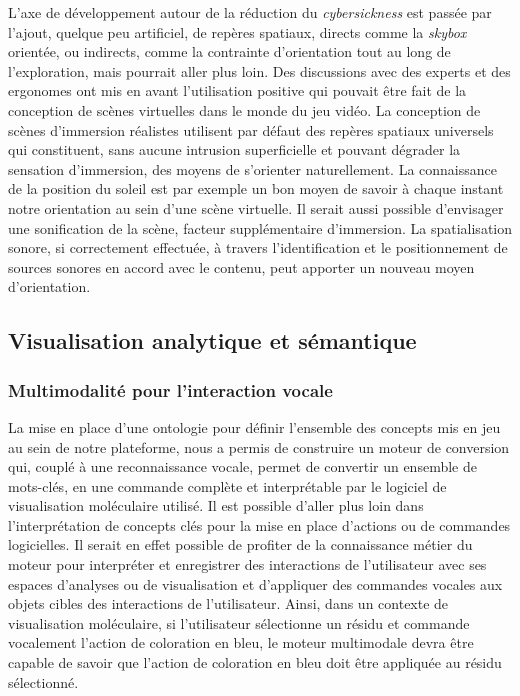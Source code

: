 L'axe de développement autour de la réduction du \textit{cybersickness} est passée par l'ajout, quelque peu artificiel, de repères spatiaux, directs comme la \textit{skybox} orientée, ou indirects, comme la contrainte d'orientation tout au long de l'exploration, mais pourrait aller plus loin. Des discussions avec des experts et des ergonomes ont mis en avant l'utilisation positive qui pouvait être fait de la conception de scènes virtuelles dans le monde du jeu vidéo. La conception de scènes d'immersion réalistes utilisent par défaut des repères spatiaux universels qui constituent, sans aucune intrusion superficielle et pouvant dégrader la sensation d'immersion, des moyens de s'orienter naturellement. La connaissance de la position du soleil est par exemple un bon moyen de savoir à chaque instant notre orientation au sein d'une scène virtuelle.
Il serait aussi possible d'envisager une sonification de la scène, facteur supplémentaire d'immersion. La spatialisation sonore, si correctement effectuée, à travers l'identification et le positionnement de sources sonores en accord avec le contenu, peut apporter un nouveau moyen d'orientation.

 

\subsection*{Visualisation analytique et sémantique}

\subsubsection{Multimodalité pour l'interaction vocale}

La mise en place d'une ontologie pour définir l'ensemble des concepts mis en jeu au sein de notre plateforme, nous a permis de construire un moteur de conversion qui, couplé à une reconnaissance vocale, permet de convertir un ensemble de mots-clés, en une commande complète et interprétable par le logiciel de visualisation moléculaire utilisé. Il est possible d'aller plus loin dans l'interprétation de concepts clés pour la mise en place d'actions ou de commandes logicielles. Il serait en effet possible de profiter de la connaissance métier du moteur pour interpréter et enregistrer des interactions de l'utilisateur avec ses espaces d'analyses ou de visualisation et d'appliquer des commandes vocales aux objets cibles des interactions de l'utilisateur. Ainsi, dans un contexte de visualisation moléculaire, si l'utilisateur sélectionne un résidu et commande vocalement l'action de coloration en bleu, le moteur multimodale devra être capable de savoir que l'action de coloration en bleu doit être appliquée au résidu sélectionné. 

